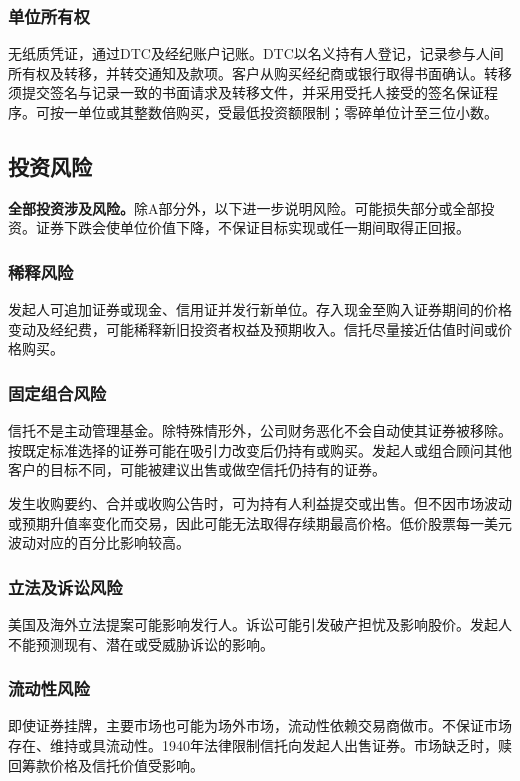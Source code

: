 \documentclass[UTF8,fontset=none,11pt,a4paper]{ctexart}
\begin{document}
\subsubsection*{单位所有权}
无纸质凭证，通过DTC及经纪账户记账。DTC以名义持有人登记，记录参与人间所有权及转移，并转交通知及款项。客户从购买经纪商或银行取得书面确认。转移须提交签名与记录一致的书面请求及转移文件，并采用受托人接受的签名保证程序。可按一单位或其整数倍购买，受最低投资额限制；零碎单位计至\allowbreak\mbox{三位小数。}


\subsection*{投资风险}
\textbf{全部投资涉及风险。}除A部分外，以下进一步说明风险。可能损失部分或全部投资。证券下跌会使单位价值下降，不保证目标实现或任一期间取\allowbreak\mbox{得正回报。}


\subsubsection*{稀释风险}
发起人可追加证券或现金、信用证并发行新单位。存入现金至购入证券期间的价格变动及经纪费，可能稀释新旧投资者权益及预期收入。信托尽量接近估值时间或\allowbreak\mbox{价格购买。}


\subsubsection*{固定组合风险}
信托不是主动管理基金。除特殊情形外，公司财务恶化不会自动使其证券被移除。按既定标准选择的证券可能在吸引力改变后仍持有或购买。发起人或组合顾问其他客户的目标不同，可能被建议出售或做空信托仍持\allowbreak\mbox{有的证券。}


发生收购要约、合并或收购公告时，可为持有人利益提交或出售。但不因市场波动或预期升值率变化而交易，因此可能无法取得存续期最高价格。低价股票每一美元波动对应的百分比\allowbreak\mbox{影响较高。}


\subsubsection*{立法及诉讼风险}
美国及海外立法提案可能影响发行人。诉讼可能引发破产担忧及影响股价。发起人不能预测现有、潜在或受威胁诉\allowbreak\mbox{讼的影响。}


\subsubsection*{流动性风险}
即使证券挂牌，主要市场也可能为场外市场，流动性依赖交易商做市。不保证市场存在、维持或具流动性。1940年法律限制信托向发起人出售证券。市场缺乏时，赎回筹款价格及信托价\allowbreak\mbox{值受影响。}
\end{document}
